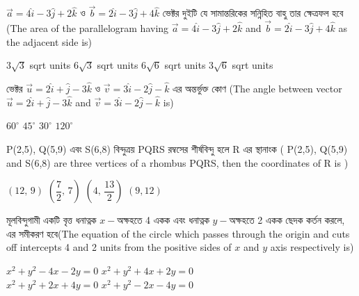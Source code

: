 \documentclass[addpoints]{exam}
\begin{document}
\begin{questions}
\begin{oneparchoices}
\end{oneparchoices}

\question  $ \vec{a} = 4\hat{i}-3\hat{j} +2\hat{k} $ ও $ \vec{b} = 2\hat{i}-3\hat{j} +4\hat{k} $ ভেক্টর দুইটি যে সামান্তরিকের সন্নিহিত বাহু তার ক্ষেত্রফল হবে (The area of the parallelogram having $ \vec{a} = 4\hat{i}-3\hat{j} +2\hat{k} $ and  $ \vec{b} = 2\hat{i}-3\hat{j} +4\hat{k} $ as the adjacent side is)

\begin{oneparchoices}
\choice $3\sqrt{3}$ sqrt units
\choice $6\sqrt{3}$ sqrt units
\choice $ 6\sqrt{6} $ sqrt units
\choice $ 3\sqrt{6} $ sqrt units

\end{oneparchoices}


\question   ভেক্টর  $ \vec{u} = 2\hat{i}+\hat{j} -3\hat{k} $ ও  $ \vec{v} = 3\hat{i}-2\hat{j} -\hat{k} $ এর অন্তর্ভুক্ত কোণ (The angle between vector  $ \vec{u} = 2\hat{i}+\hat{j} -3\hat{k} $ and $ \vec{v} = 3\hat{i}-2\hat{j} -\hat{k} $ is)

\begin{oneparchoices}
\choice $ 60^{\circ} $
\choice $ 45^{\circ} $
\choice $ 30^{\circ} $
\choice $ 120^{\circ} $

\end{oneparchoices}

\question  P(2,5), Q(5,9) এবং S(6,8) বিন্দুত্রয় PQRS রম্বসের শীর্ষবিন্দু হলে R এর স্থানাংক ( P(2,5), Q(5,9) and S(6,8) are three vertices of a rhombus PQRS, then the coordinates of R is )

\begin{oneparchoices}
\choice $ (12,\,9) $
\choice $ (\dfrac{7}{2},\, 7) $
\choice $ (4,\, \dfrac{13}{2}) $
\choice $ (9,12) $

\end{oneparchoices}


\question  মূলবিন্দুগামী একটি বৃত্ত ধনাত্নক $ x- $অক্ষহতে 4 একক এবং ধনাত্নক $ y- $অক্ষহতে 2 একক ছেদক কর্তন করলে, এর সমীকরণ হবে(The equation of the circle which passes through the origin and cuts off intercepts 4 and 2 units from the positive sides of $ x $ and $ y $ axis respectively is)

\begin{oneparchoices}
\choice $ x^2 + y^2 -4x-2y=0 $
\hspace*{1cm}\choice $ x^2 + y^2 +4x+2y=0 $\\
\hspace*{-.3cm}\choice $ x^2 + y^2 +2x+4y=0 $
\hspace*{1cm}\choice $ x^2 + y^2 -2x-4y=0 $


\end{oneparchoices}
\end{questions}
\end{document}
